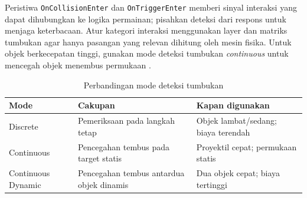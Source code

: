 \documentclass[../main.tex]{subfiles}
\begin{document}
Peristiwa \texttt{OnCollisionEnter} dan \texttt{OnTriggerEnter} memberi sinyal interaksi yang dapat dihubungkan ke logika permainan; pisahkan deteksi dari respons untuk menjaga keterbacaan. Atur kategori interaksi menggunakan layer dan matriks tumbukan agar hanya pasangan yang relevan dihitung oleh mesin fisika. Untuk objek berkecepatan tinggi, gunakan mode deteksi tumbukan \textit{continuous} untuk mencegah objek menembus permukaan \parencite{unity-collider,unity-layer-collision,unity-collision-detection}.

\begin{table}[h]
  \centering
  \caption{Perbandingan mode deteksi tumbukan}
  \begin{tabularx}{\textwidth}{@{}lXX@{}}
    \toprule
    Mode & Cakupan & Kapan digunakan \\
    \midrule
    Discrete & Pemeriksaan pada langkah tetap & Objek lambat/sedang; biaya terendah \\
    Continuous & Pencegahan tembus pada target statis & Proyektil cepat; permukaan statis \\
    Continuous Dynamic & Pencegahan tembus antardua objek dinamis & Dua objek cepat; biaya tertinggi \\
    \bottomrule
  \end{tabularx}
\end{table}

\onlyinsubfile{\printbibliography}
\end{document}
